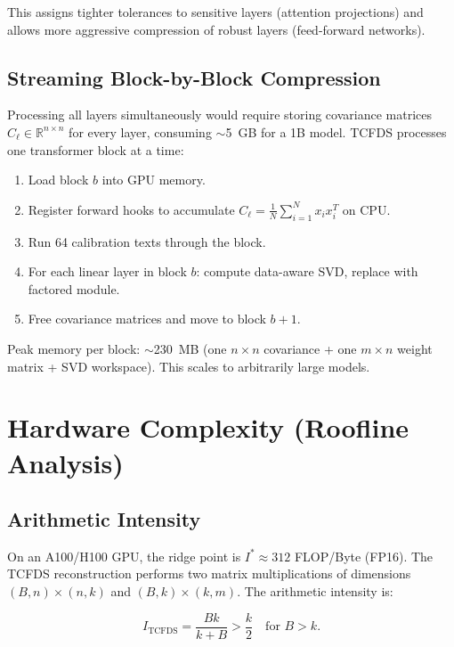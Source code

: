 \documentclass[11pt,a4paper]{article}
\begin{document}
This assigns tighter tolerances to sensitive layers (attention projections) and allows more aggressive compression of robust layers (feed-forward networks).

\subsection{Streaming Block-by-Block Compression}

Processing all layers simultaneously would require storing covariance matrices $C_\ell \in \mathbb{R}^{n \times n}$ for every layer, consuming $\sim$5~GB for a 1B model. TCFDS processes one transformer block at a time:

\begin{enumerate}
    \item Load block $b$ into GPU memory.
    \item Register forward hooks to accumulate $C_\ell = \frac{1}{N}\sum_{i=1}^{N} x_i x_i^T$ on CPU.
    \item Run 64 calibration texts through the block.
    \item For each linear layer in block $b$: compute data-aware SVD, replace with factored module.
    \item Free covariance matrices and move to block $b+1$.
\end{enumerate}

Peak memory per block: $\sim$230~MB (one $n \times n$ covariance + one $m \times n$ weight matrix + SVD workspace). This scales to arbitrarily large models.

\section{Hardware Complexity (Roofline Analysis)}

\subsection{Arithmetic Intensity}

On an A100/H100 GPU, the ridge point is $I^* \approx 312$ FLOP/Byte (FP16). The TCFDS reconstruction performs two matrix multiplications of dimensions $(B,n) \times (n,k)$ and $(B,k) \times (k,m)$. The arithmetic intensity is:

\begin{equation}
    I_{\mathrm{TCFDS}} = \frac{Bk}{k + B} > \frac{k}{2} \quad \text{for } B > k.
\end{equation}
\end{document}

